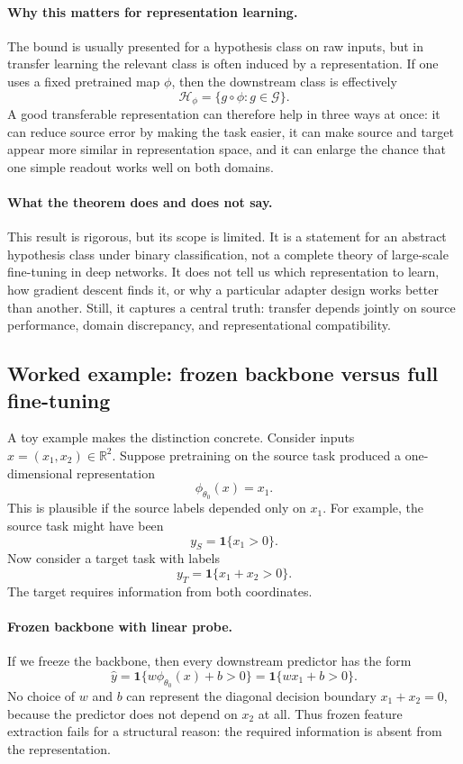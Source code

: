\paragraph{Why this matters for representation learning.}
The bound is usually presented for a hypothesis class on raw inputs, but in transfer learning the relevant class is often induced by a representation.
If one uses a fixed pretrained map $\phi$, then the downstream class is effectively
\[
\mathcal{H}_{\phi} = \{g \circ \phi : g \in \mathcal{G}\}.
\]
A good transferable representation can therefore help in three ways at once:
it can reduce source error by making the task easier, it can make source and target appear more similar in representation space, and it can enlarge the chance that one simple readout works well on both domains.

\paragraph{What the theorem does and does not say.}
This result is rigorous, but its scope is limited.
It is a statement for an abstract hypothesis class under binary classification, not a complete theory of large-scale fine-tuning in deep networks.
It does not tell us which representation to learn, how gradient descent finds it, or why a particular adapter design works better than another.
Still, it captures a central truth:
transfer depends jointly on source performance, domain discrepancy, and representational compatibility.

\subsection*{Worked example: frozen backbone versus full fine-tuning}

A toy example makes the distinction concrete.
Consider inputs $x = (x_1,x_2) \in \mathbb{R}^2$.
Suppose pretraining on the source task produced a one-dimensional representation
\[
\phi_{\theta_0}(x) = x_1.
\]
This is plausible if the source labels depended only on $x_1$.
For example, the source task might have been
\[
y_S = \mathbf{1}\{x_1 > 0\}.
\]
Now consider a target task with labels
\[
y_T = \mathbf{1}\{x_1 + x_2 > 0\}.
\]
The target requires information from both coordinates.

\paragraph{Frozen backbone with linear probe.}
If we freeze the backbone, then every downstream predictor has the form
\[
\hat y = \mathbf{1}\{w\phi_{\theta_0}(x) + b > 0\} = \mathbf{1}\{wx_1 + b > 0\}.
\]
No choice of $w$ and $b$ can represent the diagonal decision boundary $x_1 + x_2 = 0$, because the predictor does not depend on $x_2$ at all.
Thus frozen feature extraction fails for a structural reason:
the required information is absent from the representation.

